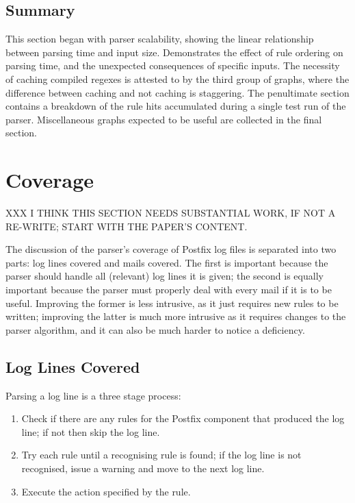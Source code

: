 \subsection{Summary}

This section began with parser scalability, showing the linear relationship
between parsing time and input size.  Demonstrates the effect of rule
ordering on parsing time, and the unexpected consequences of specific
inputs.  The necessity of caching compiled regexes is attested to by the
third group of graphs, where the difference between caching and not caching
is staggering.  The penultimate section contains a breakdown of the rule
hits accumulated during a single test run of the parser.  Miscellaneous
graphs expected to be useful are collected in the final section.

\section{Coverage}

XXX I THINK THIS SECTION NEEDS SUBSTANTIAL WORK, IF NOT A RE-WRITE\@; START
WITH THE PAPER'S CONTENT\@.

\label{parsing coverage}

The discussion of the parser's coverage of Postfix log files is separated
into two parts: log lines covered and mails covered.  The first is
important because the parser should handle all (relevant) log lines it is
given; the second is equally important because the parser must properly
deal with every mail if it is to be useful.  Improving the former is
less intrusive, as it just requires new rules to be written; improving the
latter is much more intrusive as it requires changes to the parser
algorithm, and it can also be much harder to notice a deficiency.

\subsection{Log Lines Covered}

\label{log-lines-covered}

Parsing a log line is a three stage process:

\begin{enumerate}

    \item Check if there are any rules for the Postfix component that
        produced the log line; if not then skip the log line.

    \item Try each rule until a recognising rule is found; if the log line
        is not recognised, issue a warning and move to the next log line.

    \item Execute the action specified by the rule.

\end{enumerate}

